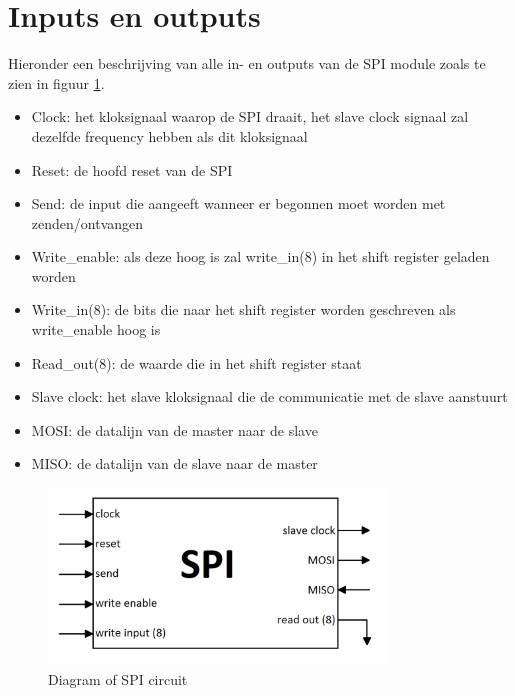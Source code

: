 \documentclass[oneside,dutch]{tudelft-report}
\begin{document}
\section{Inputs en outputs}
Hieronder een beschrijving van alle in- en outputs van de SPI module zoals te zien in figuur \ref{spi-diagram}.
\begin{itemize}
\item Clock: het kloksignaal waarop de SPI draait, het slave clock signaal zal dezelfde frequency hebben als dit kloksignaal
\item Reset: de hoofd reset van de SPI
\item Send: de input die aangeeft wanneer er begonnen moet worden met zenden/ontvangen
\item Write\_enable: als deze hoog is zal write\_in(8) in het shift register geladen worden
\item Write\_in(8): de bits die naar het shift register worden geschreven als write\_enable hoog is
\item Read\_out(8): de waarde die in het shift register staat
\item Slave clock: het slave kloksignaal die de communicatie met de slave aanstuurt
\item MOSI: de datalijn van de master naar de slave
\item MISO: de datalijn van de slave naar de master
\end{itemize}

\begin{figure}[H]
\center
\includegraphics[width=9cm]{./spi_diagram}
\caption{Diagram of SPI circuit}
\label{spi-diagram}
\end{figure}
\end{document}
